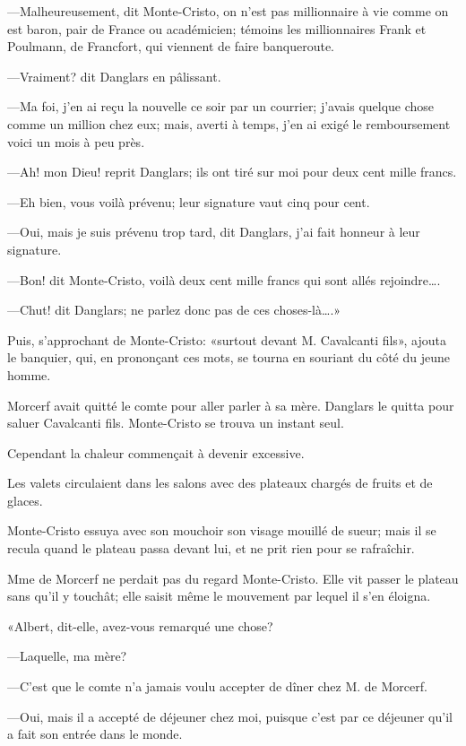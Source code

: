 —Malheureusement, dit Monte-Cristo, on n'est pas millionnaire à vie comme on est baron, pair de France ou académicien; témoins les millionnaires Frank et Poulmann, de Francfort, qui viennent de faire banqueroute. 

—Vraiment? dit Danglars en pâlissant. 

—Ma foi, j'en ai reçu la nouvelle ce soir par un courrier; j'avais quelque chose comme un million chez eux; mais, averti à temps, j'en ai exigé le remboursement voici un mois à peu près. 

—Ah! mon Dieu! reprit Danglars; ils ont tiré sur moi pour deux cent mille francs.  

—Eh bien, vous voilà prévenu; leur signature vaut cinq pour cent. 

—Oui, mais je suis prévenu trop tard, dit Danglars, j'ai fait honneur à leur signature. 

—Bon! dit Monte-Cristo, voilà deux cent mille francs qui sont allés rejoindre\dots. 

—Chut! dit Danglars; ne parlez donc pas de ces choses-là\dots.» 

Puis, s'approchant de Monte-Cristo: «surtout devant M. Cavalcanti fils», ajouta le banquier, qui, en prononçant ces mots, se tourna en souriant du côté du jeune homme. 

Morcerf avait quitté le comte pour aller parler à sa mère. Danglars le quitta pour saluer Cavalcanti fils. Monte-Cristo se trouva un instant seul. 

Cependant la chaleur commençait à devenir excessive. 

Les valets circulaient dans les salons avec des plateaux chargés de fruits et de glaces. 

Monte-Cristo essuya avec son mouchoir son visage mouillé de sueur; mais il se recula quand le plateau passa devant lui, et ne prit rien pour se rafraîchir. 

Mme de Morcerf ne perdait pas du regard Monte-Cristo. Elle vit passer le plateau sans qu'il y touchât; elle saisit même le mouvement par lequel il s'en éloigna.  

«Albert, dit-elle, avez-vous remarqué une chose? 

—Laquelle, ma mère? 

—C'est que le comte n'a jamais voulu accepter de dîner chez M. de Morcerf. 

—Oui, mais il a accepté de déjeuner chez moi, puisque c'est par ce déjeuner qu'il a fait son entrée dans le monde. 

